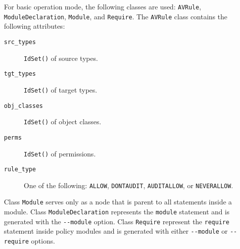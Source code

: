 For basic operation mode, the following classes are used: \texttt{AVRule},
\texttt{ModuleDeclaration}, \texttt{Module}, and \texttt{Require}. The
\texttt{AVRule} class contains the following attributes:
\begin{description}
    \item [\texttt{src\_types}] \texttt{IdSet()} of source types.
    \item [\texttt{tgt\_types}] \texttt{IdSet()} of target types.
    \item [\texttt{obj\_classes}] \texttt{IdSet()} of object classes.
    \item [\texttt{perms}] \texttt{IdSet()} of permissions.
    \item [\texttt{rule\_type}] One of the following: \texttt{ALLOW},
        \texttt{DONTAUDIT}, \texttt{AUDITALLOW}, or \texttt{NEVERALLOW}.
\end{description}
Class \texttt{Module} serves only as a node that is parent to all statements
inside a module. Class \texttt{ModuleDeclaration} represents the
\texttt{module} statement and is generated with the \texttt{-{}-module} option.
Class \texttt{Require} represent the \texttt{require} statement inside policy
modules and is generated with either \texttt{-{}-module} or \texttt{-{}-require}
options.

